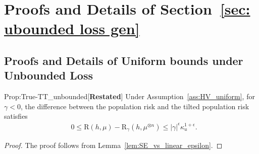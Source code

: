 \documentclass{article}
\theoremstyle{plain}
\theoremstyle{plain}
\theoremstyle{definition}
\theoremstyle{remark}
\newcommand{\RTrue}{\mathrm{R}}
\newcommand{\RTET}{\mathrm{R}_{\gamma}}
\begin{document}



\section{Proofs and Details of Section~\ref{sec: ubounded loss gen}}\label{app: sec: ubounded loss gen}
\subsection{Proofs and Details of Uniform bounds under Unbounded Loss}\label{app: sec: ubounded loss uniform}

\begin{repproposition}{Prop:True-TT_unbounded}[\textbf{Restated}]
    Under Assumption~\ref{ass:HV_uniform}, for $\gamma<0$, 
    the difference between the population risk and the tilted population risk satisfies
     \begin{equation}
        \begin{split}
          &0\leq  \RTrue(h,\mu)- \RTET(h,\mu^{\otimes n})\leq |\gamma|^{\epsilon}\kappa_u^{1+\epsilon}.
        \end{split}
    \end{equation}
\end{repproposition}
\begin{proof}
    The proof follows from Lemma~\ref{lem:SE_vs_linear_epsilon}.
\end{proof}
\end{document}
